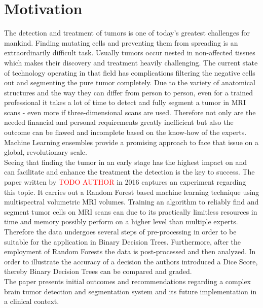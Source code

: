 \documentclass[
12pt,
headsepline,
bibliography=totoc,
twoside=semi,
fleqn
]{scrartcl}
\begin{document}

\section{Motivation\label{sec:sec1}}
The detection and treatment of tumors is one of today's greatest challenges for mankind. Finding mutating cells and preventing them from spreading is an extraordinarily difficult task. Usually tumors occur nested in non-affected tissues which makes their discovery and treatment heavily challenging. The current state of technology operating in that field has complications filtering the negative cells out and segmenting the pure tumor completely. Due to the variety of anatomical structures and the way they can differ from person to person, even for a trained professional it takes a lot of time to detect and fully segment a tumor in MRI scans - even more if three-dimensional scans are used. Therefore not only are the needed financial and personal requirements greatly inefficient but also the outcome can be flawed and incomplete based on the know-how of the experts. Machine Learning ensembles provide a promising approach to face that issue on a global, revolutionary scale.\\

Seeing that finding the tumor in an early stage has the highest impact on and can facilitate and enhance the treatment the detection is the key to success. The paper written by \textcolor{red}{TODO AUTHOR} in 2016 captures an experiment regarding this topic. It carries out a Random Forest based machine learning technique using multispectral volumetric MRI volumes. Training an algorithm to reliably find and segment tumor cells on MRI scans can due to its practically limitless resources in time and memory possibly perform on a higher level than multiple experts. Therefore the data undergoes several steps of pre-processing in order to be suitable for the application in Binary Decision Trees. Furthermore, after the employment of Random Forests the data is post-processed and then analyzed. In order to illustrate the accuracy of a decision the authors introduced a Dice Score, thereby Binary Decision Trees can be compared and graded.\\

The paper presents initial outcomes and recommendations regarding a complex brain tumor detection and segmentation system and its future implementation in a clinical context.
\end{document}
